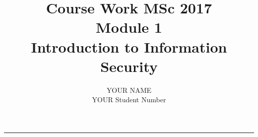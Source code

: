 \documentclass[british]{article}
\begin{document}
%

\title{Course Work MSc 2017\\
Module 1\\
Introduction to Information Security}


\author{YOUR NAME\\
YOUR Student Number}

\maketitle
\noindent \begin{center}
\rule[0.5ex]{1\linewidth}{1pt}
\par\end{center}









  
 
\end{document}
